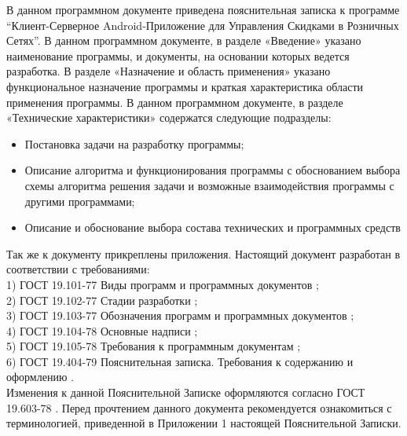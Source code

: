В данном программном документе приведена пояснительная записка к программе 
``Клиент-Серверное Android-Приложение для Управления Скидками в Розничных Сетях''.
В данном программном документе, в разделе «Введение» указано наименование
программы, и документы, на основании которых ведется разработка.
В разделе «Назначение и область применения» указано функциональное назначение
программы и краткая характеристика области применения программы.
В данном программном документе, в разделе «Технические характеристики»
содержатся следующие подразделы:
\begin{itemize}
    \item Постановка задачи на разработку программы;
    \item Описание алгоритма и функционирования программы с обоснованием выбора 
    схемы алгоритма решения задачи и возможные взаимодействия программы с 
    другими программами;
    \item Описание и обоснование выбора состава технических и программных 
    средств
\end{itemize}
Так же к документу прикреплены приложения. 
Настоящий документ разработан в соответствии с требованиями:\\
1) ГОСТ 19.101-77 Виды программ и программных документов \cite{gost_types_of_software};\\
2) ГОСТ 19.102-77 Стадии разработки \cite{gost_stages_of_devel};\\
3) ГОСТ 19.103-77 Обозначения программ и программных документов \cite{gost_marking_software};\\
4) ГОСТ 19.104-78 Основные надписи \cite{gost_main_signs};\\
5) ГОСТ 19.105-78 Требования к программным документам \cite{gost_demands_for_docs};\\
6) ГОСТ 19.404-79 Пояснительная записка. Требования к содержанию и оформлению  \cite{gost_pz}.\\


Изменения к данной Пояснительной Записке оформляются согласно ГОСТ 19.603-78 \cite{gost_main_rules_change}.
Перед прочтением данного документа рекомендуется ознакомиться с терминологией,
приведенной в Приложении 1 настоящей Пояснительной Записки.
